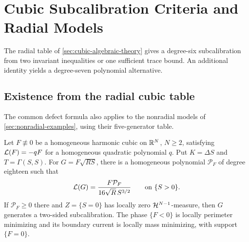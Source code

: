 \section[Cubic Subcalibration Criteria]{Cubic Subcalibration Criteria and Radial Models}
\label{sec:cubic-potentials}

The radial table of \cref{sec:cubic-algebraic-theory} gives a degree-six
subcalibration from two invariant inequalities or one sufficient trace
bound. An additional identity yields a degree-seven polynomial alternative.

\subsection{Existence from the radial cubic table}
\label{sec:cubic-unified-sextic}

The common defect formula also applies to the nonradial models of
\cref{sec:nonradial-examples}, using their five-generator table.

\begin{lemma}
\label{lem:cubic-harmonic-common-potential}
Let \(F\not\equiv0\) be a homogeneous harmonic cubic on \(\mathbb R^N\),
\(N\ge2\), satisfying \(\mathcal L(F)=-qF\) for a homogeneous quadratic polynomial
\(q\). Put \(K=\Delta S\) and \(T=\Gamma(S,S)\). For
\(G=F\sqrt{RS}\), there is a homogeneous polynomial
\(\mathcal P_F\) of degree eighteen such that
\begin{equation}\label{eq:cubic-harmonic-common-defect}
 \mathcal L(G)=\frac{F\mathcal P_F}{16\sqrt R\,S^{3/2}}
 \qquad\text{on }\{S>0\}.
\end{equation}
If \(\mathcal P_F\ge0\) there and
\(Z=\{S=0\}\) has locally zero \(\mathcal H^{N-1}\)-measure, then
\(G\) generates a two-sided subcalibration. The phase \(\{F<0\}\)
is locally perimeter minimizing and its boundary current is locally
mass minimizing, with support \(\{F=0\}\).
\end{lemma}

